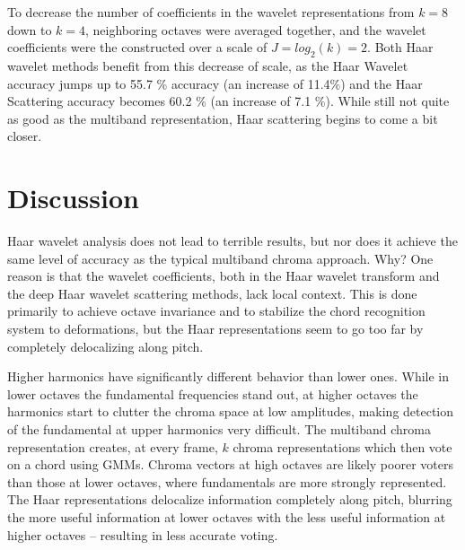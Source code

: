 \documentclass{article}
\begin{document}
	To decrease the number of coefficients in the wavelet representations from $k=8$ down to $k=4$, neighboring octaves were averaged together, and the wavelet coefficients were the constructed over a scale of $J = log_2(k) = 2$. Both Haar wavelet methods benefit from this decrease of scale, as the Haar Wavelet accuracy jumps up to 55.7 \% accuracy (an increase of 11.4\%) and the Haar Scattering accuracy becomes 60.2 \% (an increase of 7.1 \%). While still not quite as good as the multiband representation, Haar scattering begins to come a bit closer.
	

\section{Discussion}\label{sec:discussion}

Haar wavelet analysis does not lead to terrible results, but nor does it achieve the same level of accuracy as the typical multiband chroma approach. Why? One reason is that the wavelet coefficients, both in the Haar wavelet transform and the deep Haar wavelet scattering methods, lack local context. This is done primarily to achieve octave invariance and to stabilize the chord recognition system to deformations, but the Haar representations seem to go too far by completely delocalizing along pitch. 
	
	Higher harmonics have significantly different behavior than lower ones. While in lower octaves the fundamental frequencies stand out, at higher octaves the harmonics start to clutter the chroma space at low amplitudes, making detection of the fundamental at upper harmonics very difficult. The multiband chroma representation creates, at every frame, $k$ chroma representations which then vote on a chord using GMMs. Chroma vectors at high octaves are likely poorer voters than those at lower octaves, where fundamentals are more strongly represented. The Haar representations delocalize information completely along pitch, blurring the more useful information at lower octaves with the less useful information at higher octaves -- resulting in less accurate voting. 




%
%
%
%
\end{document}
